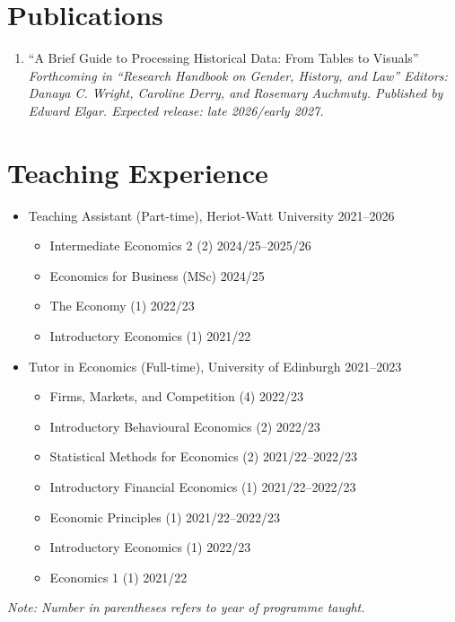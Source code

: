 \documentclass[11pt,a4paper]{article}
\begin{document}
\section{Publications}
\begin{enumerate}
    \item ``A Brief Guide to Processing Historical Data: From Tables to Visuals'' 
    \textit{\newline Forthcoming in ``Research Handbook on Gender, History, and Law''
    \newline Editors: Danaya C. Wright, Caroline Derry, and Rosemary Auchmuty. 
    \newline Published by Edward Elgar. Expected release: late 2026/early 2027.}
\end{enumerate}

\section{Teaching Experience}
\begin{itemize}
    \item [] Teaching Assistant (Part-time), Heriot-Watt University \hfill 2021--2026
    \begin{itemize}
        \item [] Intermediate Economics 2 (2) \hfill 2024/25--2025/26
        \item [] Economics for Business (MSc) \hfill 2024/25 
        \item [] The Economy (1) \hfill 2022/23 
        \item []Introductory Economics (1) \hfill 2021/22
    \end{itemize}
    \item [] Tutor in Economics (Full-time), University of Edinburgh \hfill 2021--2023
    \begin{itemize}
        \item [] Firms, Markets, and Competition (4) \hfill 2022/23 
        \item [] Introductory Behavioural Economics (2) \hfill 2022/23 
        \item [] Statistical Methods for Economics (2) \hfill 2021/22--2022/23
        \item [] Introductory Financial Economics (1) \hfill 2021/22--2022/23
        \item [] Economic Principles (1) \hfill 2021/22--2022/23
        \item [] Introductory Economics (1) \hfill 2022/23
        \item [] Economics 1 (1) \hfill 2021/22
    \end{itemize}
\end{itemize} 
\medskip
\small\textit{Note: Number in parentheses refers to year of programme taught.}
\end{document}
